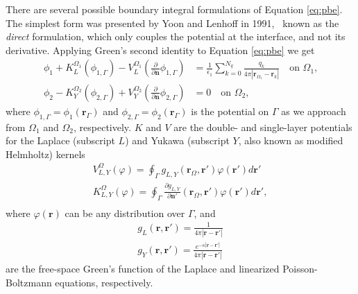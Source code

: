 There are several possible boundary integral formulations of Equation \eqref{eq:pbe}.~\cite{SearchCooperWout2022} The simplest form was presented by Yoon and Lenhoff in 1991,~\cite{YoonLenhoff1990} known as the \emph{direct} formulation, which only couples the potential at the interface, and not its derivative.
Applying Green's second identity to Equation \eqref{eq:pbe} we get 
%
\begin{align} \label{eq:volume_potential}
\phi_{1}+ K_{L}^{\Omega_1}(\phi_{1,\Gamma}) -  V_{L}^{\Omega_1} \left(\frac{\partial}{\partial \mathbf{n}}  \phi_{1,\Gamma}  \right) & = \frac{1}{\epsilon_1} \sum_{k=0}^{N_q}  \frac{q_k}{4\pi|\mathbf{r}_{\Omega_1} - \mathbf{r}_k|}  \quad \text{on $\Omega_1$,} \nonumber \\
\phi_{2} - K_{Y}^{\Omega_2}(\phi_{2,\Gamma}) + V_{Y}^{\Omega_2} \left( \frac{\partial}{\partial \mathbf{n}} \phi_{2,\Gamma} \right) & = 0 \quad \text{on $\Omega_2$,}
\end{align}
%
where $\phi_{1,\Gamma} = \phi_1(\mathbf{r}_\Gamma)$ and $\phi_{2,\Gamma} = \phi_2(\mathbf{r}_\Gamma)$ is the potential on $\Gamma$ as we approach from $\Omega_1$ and $\Omega_2$, respectively. $K$ and $V$ are the double- and single-layer potentials for the Laplace (subscript $L$) and Yukawa (subscript $Y$, also known as modified Helmholtz) kernels
%
\begin{align}\label{eq:single_double}
V^\Omega_{L,Y}(\varphi) = \oint_\Gamma g_{L,Y}(\mathbf{r}_\Omega,\mathbf{r}')\varphi(\mathbf{r}')d\mathbf{r}'\nonumber\\
K^\Omega_{L,Y}(\varphi) = \oint_\Gamma \frac{\partial g_{L,Y}}{\partial\mathbf{n}'}(\mathbf{r}_\Omega,\mathbf{r}')\varphi(\mathbf{r}')d\mathbf{r}',\nonumber\\
\end{align}
%
where $\varphi(\mathbf{r})$ can be any distribution over $\Gamma$, and 
%
\begin{align}\label{eq:green_func}
g_L(\mathbf{r},\mathbf{r}')=\frac{1}{4\pi|\mathbf{r}-\mathbf{r}'|} \nonumber \\
g_Y(\mathbf{r},\mathbf{r}')=\frac{e^{-\kappa|\mathbf{r}-\mathbf{r}'|}}{4\pi|\mathbf{r}-\mathbf{r}'|}
\end{align}
%
are the free-space Green's function of the Laplace and linearized Poisson-Boltzmann equations, respectively. 

